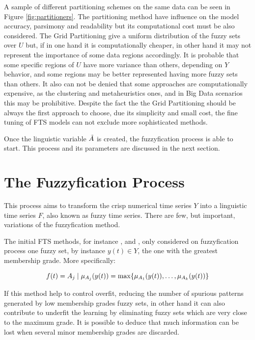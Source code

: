 A sample of different partitioning schemes on the same data can be seen in Figure \ref{fig:partitioners}. The partitioning method have influence on the model accuracy, parsimony and readability but its computational cost must be also considered. The Grid Partitioning give a uniform distribution of the fuzzy sets over $U$ but, if in one hand it is computationally cheaper, in other hand it may not represent the importance of some data regions accordingly. It is probable that some specific regions of $U$ have more variance than others, depending on $Y$ behavior, and some regions may be better represented having more fuzzy sets than others. It also can not be denied that some approaches are computationally expensive, as the clustering and metaheuristics ones, and in Big Data scenarios this may be prohibitive. Despite the fact the the Grid Partitioning should be always the first approach to choose, due its simplicity and small cost, the fine tuning of FTS models can not exclude more sophisticated methods.

Once the linguistic variable $\tilde{A}$ is created, the fuzzyfication process is able to start. This process and its parameters are discussed in the next section.


%
\section{The Fuzzyfication Process}
\label{sec:fts_fuzzyfication}

This process aims to transform the crisp numerical time series $Y$ into a linguistic time series $F$, also known as fuzzy time series. There are few, but important, variations of the fuzzyfication method.

The initial FTS methods, for instance \cite{song1993fuzzy}, \cite{chen1996forecasting} and \cite{yu2005weighted}, only considered on fuzzyfication process one fuzzy set, by instance $y(t) \in Y$, the one with the greatest membership grade. More specifically:

\begin{equation}
f(t) = A_j\; |\; \mu_{A_j}(y(t)) = \max\{ \mu_{A_1}(y(t)), \ldots, \mu_{A_k}(y(t)) \}    
\label{eqn:fuzzyfication_maximum}
\end{equation}

If this method help to control overfit, reducing the number of spurious patterns generated by low membership grades fuzzy sets, in other hand it can also contribute to underfit the learning by eliminating fuzzy sets which are very close to the maximum grade. It is possible to deduce that much information can be lost when several minor membership grades are discarded.

